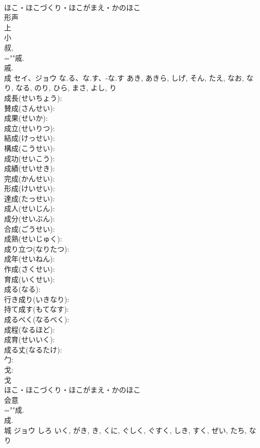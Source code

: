 \documentclass[8pt]{extreport}
\begin{document}
\begin{CJK}{UTF8}{min}
\\	ほこ・ほこづくり・ほこがまえ・かのほこ	
\\	形声 
\\	上 
\\	小 
\\	叔, 
\\	=""戚.
\\	戚.
\\	成	セイ、ジョウ	な.る、な.す、-な.す	あき, あきら, しげ, そん, たえ, なお, なり, なる, のり, ひら, まさ, よし, り	
\\	成長(せいちょう): 
\\	賛成(さんせい): 
\\	成果(せいか): 
\\	成立(せいりつ): 
\\	結成(けっせい): 
\\	構成(こうせい): 
\\	成功(せいこう): 
\\	成績(せいせき): 
\\	完成(かんせい): 
\\	形成(けいせい): 
\\	達成(たっせい): 
\\	成人(せいじん): 
\\	成分(せいぶん): 
\\	合成(ごうせい): 
\\	成熟(せいじゅく): 
\\	成り立つ(なりたつ): 
\\	成年(せいねん): 
\\	作成(さくせい): 
\\	育成(いくせい): 
\\	成る(なる): 
\\	行き成り(いきなり): 
\\	持て成す(もてなす): 
\\	成るべく(なるべく): 
\\	成程(なるほど): 
\\	成育(せいいく): 
\\	成る丈(なるたけ): 
\\	勹: 
\\	戈: 
\\	戈	
\\	ほこ・ほこづくり・ほこがまえ・かのほこ	
\\	会意 
\\	=""成.
\\	成.
\\	城	ジョウ	しろ	いく, がき, き, くに, ぐしく, ぐすく, しき, すく, ぜい, たち, なり	

\end{CJK}
\end{document}
